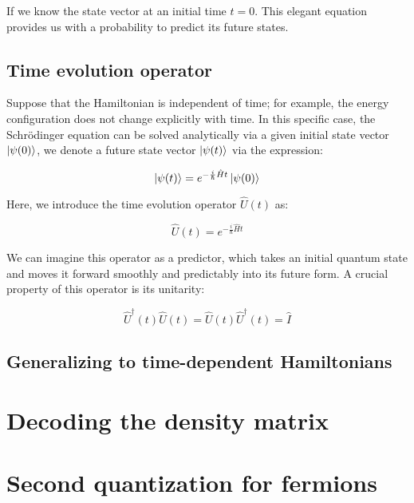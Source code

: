 If we know the state vector at an initial time $t=0$. This elegant equation provides us with a probability to predict its future states.

\subsection{Time evolution operator}

Suppose that the Hamiltonian is independent of time; for example, the energy configuration does not change explicitly with time. In this specific case, the Schrödinger equation can be solved analytically via a given initial state vector $\ket{\psi(0)}$, we denote a future state vector $\ket{\psi(t)}$ via the expression:

\begin{equation}
    \ket{\psi(t)}=e^{-\frac{i}{\hbar}\hat{H}t}\ket{\psi(0)}
    \label{state_vec}
\end{equation}

Here, we introduce the time evolution operator $\hat{U}(t)$ as:

\begin{equation}
    \hat{U}(t) = e^{-\frac{i}{\hbar}\hat{H}t}
    \label{evolution_ope}
\end{equation}

We can imagine this operator as a predictor, which takes an initial quantum state and moves it forward smoothly and predictably into its future form. A crucial property of this operator is its unitarity:

\begin{equation}
    \hat{U}^\dagger(t)\hat{U}(t)=\hat{U}(t)\hat{U}^\dagger(t) = \hat{I}
    \label{evolution_unitarity}
\end{equation}

\subsection{Generalizing to time-dependent Hamiltonians}

\newpage
\section{Decoding the density matrix}

\newpage
\section{Second quantization for fermions}

